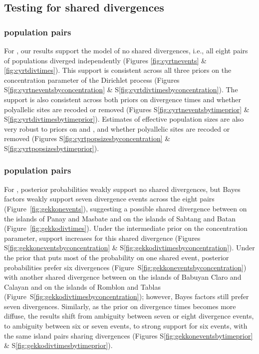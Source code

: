 \subsection{Testing for shared divergences}

\subsubsection{ population pairs}
For , our \ecoevolity results support the model of no shared
divergences, i.e., all eight pairs of populations diverged independently
(Figures \ref{fig:cyrtnevents} \& \ref{fig:cyrtdivtimes}).
This support is consistent across all three priors on the concentration
parameter of the Dirichlet process
(Figures
S\ref{fig:cyrtneventsbyconcentration}
\&
S\ref{fig:cyrtdivtimesbyconcentration}).
The support is also consistent across both priors on divergence times
and whether polyallelic sites are recoded or removed
(Figures
S\ref{fig:cyrtneventsbytimeprior}
\&
S\ref{fig:cyrtdivtimesbytimeprior}).
Estimates of effective population sizes are also very robust to
priors on \concentration and \divtime, and whether polyallelic sites
are recoded or removed
(Figures
S\ref{fig:cyrtpopsizesbyconcentration}
\&
S\ref{fig:cyrtpopsizesbytimeprior}).

\ifembed{

}{}

\ifembed{

}{}

\subsubsection{ population pairs}
For , posterior probabilities weakly support no shared divergences,
but Bayes factors weakly support seven divergence events across the eight pairs
(Figure~\ref{fig:gekkonevents}),
suggesting a possible shared divergence between
 on the islands of Panay and Masbate
and
 on the islands of Sabtang and Batan
(Figure~\ref{fig:gekkodivtimes}).
Under the intermediate prior on the concentration parameter, support
increases for this shared divergence 
(Figures
S\ref{fig:gekkoneventsbyconcentration}
\&
S\ref{fig:gekkodivtimesbyconcentration}).
Under the prior that puts most of the probability on one shared event,
posterior probabilities prefer six divergences
(Figure~S\ref{fig:gekkoneventsbyconcentration})
with another shared divergence between
 on the islands of Babuyan Claro and Calayan
and
 on the islands of Romblon and Tablas
(Figure~S\ref{fig:gekkodivtimesbyconcentration});
however, Bayes factors still prefer seven divergences.
Similarly, as the prior on divergence times becomes more diffuse,
the results shift from ambiguity between seven or eight divergence
events, to ambiguity between six or seven events, to strong
support for six events, with the same island pairs sharing
divergences
(Figures
S\ref{fig:gekkoneventsbytimeprior}
\&
S\ref{fig:gekkodivtimesbytimeprior}).

